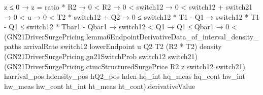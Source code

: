 \documentclass[10pt]{article}
\begin{document}
\begin{ReviewVerbatim}
          z ≤ 0 →
            z = ratio * R2 →
              0 < R2 →
                0 < switch12 →
                  0 < switch12 + switch21 →
                    0 < u →
                      0 < T2 * switch12 + Q2 →
                        0 ≤ switch12 * T1 - Q1 →
                          switch12 * T1 - Q1 ≤ switch12 * Tbar1 - Qbar1 →
                            switch12 < Q1 →
                              Q1 ≤ Qbar1 →
                                0 <
                                  (GN21DriverSurgePricing.lemma6EndpointDerivativeData_of_interval_density_paths
                                      arrivalRate switch12 lowerEndpoint u Q2 T2 (R2 * T2) density
                                      (GN21DriverSurgePricing.gn21SwitchProb switch12 switch21)
                                      (GN21DriverSurgePricing.ctmcStructuredSurgePrice R2 z switch12 switch21)
                                      harrival_pos hdensity_pos hQ2_pos hden hq_int hq_meas hq_cont hw_int hw_meas
                                      hw_cont ht_int ht_meas ht_cont).derivativeValue
\end{ReviewVerbatim}
\end{document}
